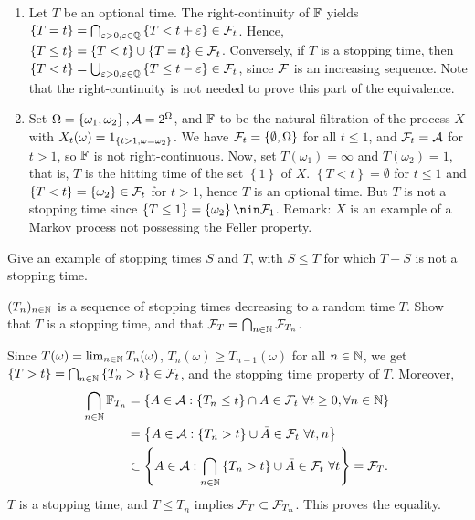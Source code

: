 \solution 
\begin{enumerate}
    \item Let $T$ be an optional time. The right-continuity of $\mathbb F$ yields
        $\left\{ T=t \right\} = \bigcap_{\varepsilon>0, \varepsilon\in\mathbb Q}
        \left\{ T<t+\varepsilon \right\} \in \mathcal F_{t}$. Hence, $\left\{ T\leq t \right\} =
        \left\{ T<t \right\} \cup \left\{ T=t \right\} \in \mathcal F_{t}$.  Conversely, if $T$ is a
        stopping time, then $\left\{ T<t \right\} =
        \bigcup_{\varepsilon>0,\varepsilon\in\mathbb Q} \left\{ T \leq t-\varepsilon
        \right\}\in \mathcal F_t$, since $\mathcal F$ is an increasing sequence. Note that the
        right-continuity is not needed to prove this part of the equivalence. 
    \item Set $\Omega = \left\{ \omega_{1}, \omega_{2} \right\}, \mathcal A =
        2^{\Omega}$, and $\mathbb F$ to be the natural filtration of the process $X$
        with $X_t(\omega) = 1_{ \left\{ t>1, \omega= \omega_{2} \right\} }$.
        We have $\mathcal F_{t} = \left\{ \emptyset, \Omega \right\}$ for all $t\leq
        1$, and $\mathcal F_{t} = \mathcal A$ for $t>1$, so $\mathbb F$ is not right-continuous.
        Now, set $T(\omega_{1}) = \infty$ and $T(\omega_{2}) = 1$, that is, $T$
        is the hitting time of the set $\left\{ 1 \right\}$ of $X$. $\left\{ T
        < t \right\} = \emptyset$ for $t\leq 1$ and $\left\{ T < t  \right\} =
        \left\{ \omega_{2} \right\} \in \mathcal F_{t}$ for $t>1$, hence $T$ is an
        optional time.  But $T$ is not a stopping time since $\left\{ {T\leq 1}
    \right\} = \left\{ \omega_{2} \right\} \nin \cF_{1}$. Remark: $X$ is an
    example of a Markov process not possessing the Feller property. 
\end{enumerate}


 Give an example of stopping times $S$
and $T$, with $S\leq T$ for which $T-S$ is not a stopping time. 

\solution

$(T_n)_{n\in\mathbb N}$ is a sequence of stopping times decreasing to a random time
$T$. Show that $T$ is a stopping time, and that $\mathcal F_{T} = \bigcap_{n\in\mathbb N}
\mathcal F_{T_n}$. 

\solution 
Since $T(\omega) = \lim_{n\in\mathbb N} T_{n}(\omega)$, $T_{n}(\omega) \geq
T_{n-1}(\omega)$ for all $n\in\mathbb N$, we get $\left\{ T>t \right\} =
\bigcap_{n\in\mathbb N} \left\{ T_{n}>t \right\} \in \mathcal F_{t}$, and the stopping time
property of $T$. Moreover, 
\begin{align*}
    \bigcap_{n\in\mathbb N} \mathbb F_{T_{n}} &= \left\{ A\in\mathcal A : \left\{ T_n\leq t \right\}\cap A \in \mathcal F_{t} \ \forall t\geq 0,\forall n\in\mathbb N \right\} \\
    &= \left\{ A \in \mathcal A : \left\{ T_{n}>t \right\}\cup \bar A \in\mathcal F_{t} \ \forall t,n \right\} \\
    &\subset \left\{A\in\mathcal A :\bigcap_{n\in\mathbb N} \left\{T_{n}>t\right\} \cup \bar A\in\mathcal F_t \ \forall t \right\}
    = \mathcal F_{T}.
\end{align*}
$T$ is a stopping time, and $T\leq T_n$ implies $\mathcal F_{T} \subset \mathcal F_{T_{n}}$.
This proves the equality.

